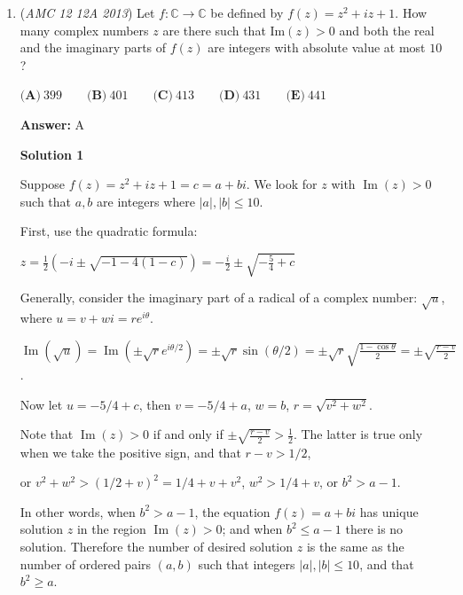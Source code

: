 \begin{enumerate}
 \[= \frac{1}{66\cdot 65\cdot 64} (12^2 (99+33) + 12^3(18+6)) = \frac{1}{66\cdot 65\cdot 64} (12^3 \cdot 35) = \frac{63}{286}\]

 So $p = 223/286$, which is answer choice $\boxed{\mathbf{(E)}}$.

 \href{https://artofproblemsolving.com/videos/amc/2013amc12a/364}{https://artofproblemsolving.com/videos/amc/2013amc12a/364}

 


	\item (\textit{AMC 12 12A 2013}) Let $f : \mathbb{C} \to \mathbb{C}$ be defined by $f(z) = z^2 + iz + 1$. How many complex numbers $z$ are there such that $\text{Im}(z) > 0$ and both the real and the imaginary parts of $f(z)$ are integers with absolute value at most $10$?


 $\textbf{(A)} \ 399 \qquad \textbf{(B)} \ 401 \qquad \textbf{(C)} \ 413 \qquad \textbf{(D)} \ 431 \qquad \textbf{(E)} \ 441$

 \textbf{Answer: }A



\textbf{Solution 1}

Suppose $f(z)=z^2+iz+1=c=a+bi$. We look for $z$ with $\operatorname{Im}(z)>0$ such that $a,b$ are integers where $|a|, |b|\leq 10$.

 First, use the quadratic formula:

 $z = \frac{1}{2} (-i \pm \sqrt{-1-4(1-c)}) = -\frac{i}{2} \pm \sqrt{ -\frac{5}{4} + c }$

 Generally, consider the imaginary part of a radical of a complex number: $\sqrt{u}$, where $u = v+wi = r e^{i\theta}$.

 $\operatorname{Im}(\sqrt{u}) = \operatorname{Im}(\pm \sqrt{r} e^{i\theta/2}) = \pm \sqrt{r} \sin(\theta/2) = \pm \sqrt{r}\sqrt{\frac{1-\cos\theta}{2}} = \pm \sqrt{\frac{r-v}{2}}$.

 Now let $u= -5/4 + c$, then $v = -5/4 + a$, $w=b$, $r=\sqrt{v^2 + w^2}$.

 Note that $\operatorname{Im}(z)>0$ if and only if $\pm \sqrt{\frac{r-v}{2}}>\frac{1}{2}$. The latter is true only when we take the positive sign, and that $r-v > 1/2$,

 or $v^2 + w^2 > (1/2 + v)^2 = 1/4 + v + v^2$, $w^2 > 1/4 + v$, or $b^2 > a-1$.

 In other words, when $b^2 > a-1$, the equation $f(z)=a+bi$ has unique solution $z$ in the region $\operatorname{Im}(z)>0$; and when $b^2 \leq a-1$ there is no solution. Therefore the number of desired solution $z$ is the same as the number of ordered pairs $(a,b)$ such that integers $|a|, |b|\leq 10$, and that $b^2 \geq a$.


\end{enumerate}
